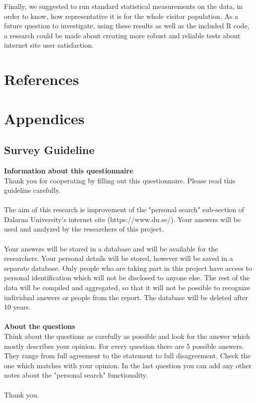 \documentclass[12pt,a4paper,paper=a4,oneside,titlepage,pdftex]{scrartcl}
\begin{document}
Finally, we suggested to run standard statistical measurements on the data, in order to know, how representative it is for the whole visitor population. As a future question to investigate, using these results as well as the included R code, a research could be made about creating more robust and reliable tests about internet site user satisfaction.

\section*{References}

\renewcommand\refname{\vskip -1cm}


\section{Appendices}

\subsection{Survey Guideline}
\textbf{Information about this questionnaire}\\
Thank you for cooperating by filling out this questionnaire. Please read this guideline carefully.
\\ \\
The aim of this research is improvement of the "personal search" sub-section of Dalarna University's internet site (https://www.du.se/). Your answers will be used and analyzed by the researchers of this project.
\\ \\
Your answers will be stored in a database and will be available for the researchers. Your personal details will be stored, however will be saved in a separate database. Only people who are taking part in this project have access to personal identification which will not be disclosed to anyone else. The rest of the data will be compiled and aggregated, so that it will not be possible to recognize individual answers or people from the report. The database will be deleted after 10 years.
\\ \\
\textbf{About the questions}\\
Think about the questions as carefully as possible and look for the answer which mostly describes your opinion. For every question there are 5 possible answers. They range from full agreement to the statement to full disagreement. Check the one which matches with your opinion. In the last question you can add any other notes about the "personal search" functionality.
\\ \\
Thank you.
\end{document}
